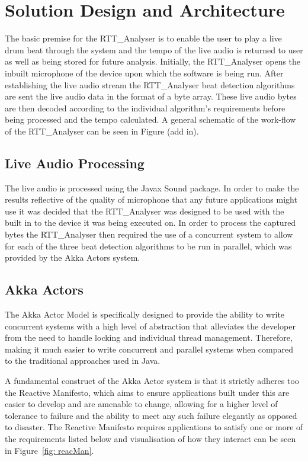 \documentclass[a4paper, 11pt]{article}
\begin{document}
\maketitle{} \section{Solution Design and Architecture}
The basic premise for the RTT\_Analyser is to enable the user to play a live drum beat through the system and the tempo of the live audio is returned to user as well as being stored for future analysis. Initially, the RTT\_Analyser opens the inbuilt microphone of the device upon which the software is being run. After establishing the live audio stream the RTT\_Analyser beat detection algorithms are sent the live audio data in the format of a byte array. These live audio bytes are then decoded according to the individual algorithm's requirements before being processed and the tempo calculated. A general schematic of the work-flow of the RTT\_Analyser can be seen in Figure (add in).

\subsection{Live Audio Processing}
The live audio is processed using the Javax Sound package. In order to make the results reflective of the quality of microphone that any future applications might use it was decided that the RTT\_Analyser was designed to be used with the built in to the device it was being executed on. In order to process the captured bytes the RTT\_Analyser then required the use of a concurrent system to allow for each of the three beat detection algorithms to be run in parallel, which was provided by the Akka Actors system.

\subsection{Akka Actors}
The Akka Actor Model is specifically designed to provide the ability to write concurrent systems with a high level of abstraction that alleviates the developer from the need to handle locking and individual thread management. Therefore, making it much easier to write concurrent and parallel systems when compared to the traditional approaches used in Java\cite{akkaActors}.

A fundamental construct of the Akka Actor system is that it strictly adheres too the Reactive Manifesto, which aims to ensure applications built under this are easier to develop and are amenable to change, allowing for a higher level of tolerance to failure and the ability to meet any such failure elegantly as opposed to disaster\cite{reactMan}. The Reactive Manifesto requires applications to satisfy one or more of the requirements listed below\cite{reactMan} and visualisation of how they interact can be seen in Figure~\ref{fig: reacMan}.
\end{document}
